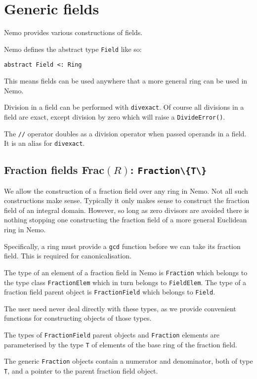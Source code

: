 \documentclass[a4paper,10pt]{article}
\newcommand{\code}{\lstinline}
\begin{document}
\section{Generic fields}

Nemo provides various constructions of fields. 

Nemo defines the abstract type \code{Field} like so:

\begin{lstlisting}
abstract Field <: Ring
\end{lstlisting}

This means fields can be used anywhere that a more general ring can be used
in Nemo.

Division in a field can be performed with \code{divexact}. Of course all
divisions in a field are exact, except division by zero which will raise
a \code{DivideError()}.

The \code{//} operator doubles as a division operator when passed operands
in a field. It is an alias for \code{divexact}.

\subsection{Fraction fields Frac$(R)$: \code|Fraction\{T\}|}

We allow the construction of a fraction field over any ring in Nemo. Not all
such constructions make sense. Typically it only makes sense to construct the
fraction field of an integral domain. However, so long as zero divisors are
avoided there is nothing stopping one constructing the fraction field of a
more general Euclidean ring in Nemo.

Specifically, a ring must provide a \code{gcd} function before we can take its
fraction field. This is required for canonicalisation.

The type of an element of a fraction field in Nemo is \code{Fraction} which
belongs to the type class \code{FractionElem} which in turn belongs to
\code{FieldElem}. The type of a fraction field parent object is
\code{FractionField} which belongs to \code{Field}.

The user need never deal directly with these types, as we provide convenient
functions for constructing objects of those types.

The types of \code{FractionField} parent objects and \code{Fraction} elements
are parameterised by the type \code{T} of elements of the base ring of the
fraction field.

The generic \code{Fraction} objects contain a numerator and denominator, both
of type \code{T}, and a pointer to the parent fraction field object.
\end{document}

